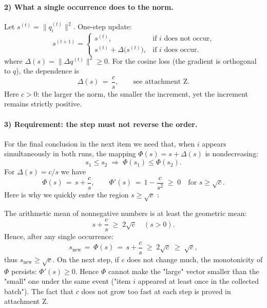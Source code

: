 \paragraph{2) What a single occurrence does to the norm.}
Let $s^{(t)} = \bigl\|q_i^{(t)}\bigr\|^2$. One-step update:
\begin{equation}
s^{(t+1)} = \begin{cases}
s^{(t)}, & \text{if $i$ does not occur,} \\
s^{(t)} + \Delta\bigl(s^{(t)}\bigr), & \text{if $i$ does occur.}
\end{cases}
\end{equation}
where $\Delta(s) = \bigl\|\Delta q^{(t)}\bigr\|^2 \ge 0$. For the cosine loss (the gradient is orthogonal to $q$), the dependence is
\begin{equation}
\Delta(s) \,=\, \frac{c}{s}, \qquad \text{see attachment Z}.
\end{equation}
Here $c > 0$: the larger the norm, the smaller the increment, yet the increment remains strictly positive.

\paragraph{3) Requirement: the step must not reverse the order.}
For the final conclusion in the next item we need that, when $i$ appears simultaneously in both runs, the mapping $\Phi(s) = s + \Delta(s)$ is nondecreasing:
\begin{equation}
s_1 \le s_2 \;\Rightarrow\; \Phi(s_1) \le \Phi(s_2).
\end{equation}
For $\Delta(s) = c/s$ we have
\begin{equation}
\Phi(s) \,=\, s + \frac{c}{s}, \qquad \Phi'(s) \,=\, 1 - \frac{c}{s^2} \;\ge\; 0 \quad \text{for } s \ge \sqrt{c}.
\end{equation}
Here is why we quickly enter the region $s \ge \sqrt{c}$ : 

The arithmetic mean of nonnegative numbers is at least the geometric mean:
\begin{equation}
s + \frac{c}{s} \;\ge\; 2\sqrt{c} \quad (s>0).
\end{equation}
Hence, after any single occurrence:
\begin{equation}
s_{\mathrm{new}} \,=\, \Phi(s) \,=\, s + \frac{c}{s} \;\ge\; 2\sqrt{c} \;\ge\; \sqrt{c} ,
\end{equation}
thus $s_{\mathrm{new}} \ge \sqrt{c}$. On the next step, if $c$ does not change much, the monotonicity of $\Phi$ persists: $\Phi'(s) \ge 0$. Hence $\Phi$ cannot make the "large" vector smaller than the "small" one under the same event ("item $i$ appeared at least once in the collected batch"). The fact that $c$ does not grow too fast at each step is proved in attachment Z.

